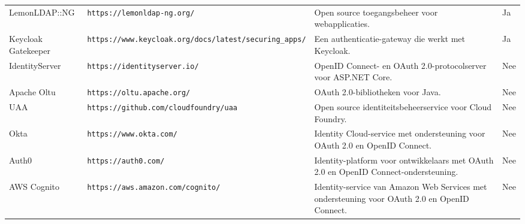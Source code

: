 \begin{table}[htbp]
\begin{adjustbox}{width=1\textwidth}
\begin{tabular}{@{}llll@{}}
    LemonLDAP::NG & \texttt{https://lemonldap-ng.org/}     & Open source toegangsbeheer voor webapplicaties.                               & Ja                        \\
    Keycloak Gatekeeper & \texttt{https://www.keycloak.org/docs/latest/securing\_apps/} & Een authenticatie-gateway die werkt met Keycloak.                     & Ja                        \\
    IdentityServer & \texttt{https://identityserver.io/}    & OpenID Connect- en OAuth 2.0-protocolserver voor ASP.NET Core.               & Nee                       \\
    Apache Oltu   & \texttt{https://oltu.apache.org/}      & OAuth 2.0-bibliotheken voor Java.                                             & Nee                       \\
    UAA           & \texttt{https://github.com/cloudfoundry/uaa} & Open source identiteitsbeheerservice voor Cloud Foundry.                & Nee                       \\
    Okta          & \texttt{https://www.okta.com/}         & Identity Cloud-service met ondersteuning voor OAuth 2.0 en OpenID Connect.    & Nee                       \\
    Auth0         & \texttt{https://auth0.com/}            & Identity-platform voor ontwikkelaars met OAuth 2.0 en OpenID Connect-ondersteuning. & Nee                       \\
    AWS Cognito   & \texttt{https://aws.amazon.com/cognito/} & Identity-service van Amazon Web Services met ondersteuning voor OAuth 2.0 en OpenID Connect. & Nee                       \\ \bottomrule
  \end{tabular}
  \end{adjustbox}
\end{table}
